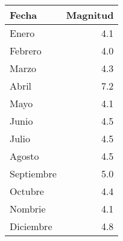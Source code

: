 \begin{tabular}{lr}
\toprule
     Fecha &  Magnitud \\
\midrule
     Enero &       4.1 \\
   Febrero &       4.0 \\
     Marzo &       4.3 \\
     Abril &       7.2 \\
      Mayo &       4.1 \\
     Junio &       4.5 \\
     Julio &       4.5 \\
    Agosto &       4.5 \\
Septiembre &       5.0 \\
   Octubre &       4.4 \\
   Nombrie &       4.1 \\
 Diciembre &       4.8 \\
\bottomrule
\end{tabular}
